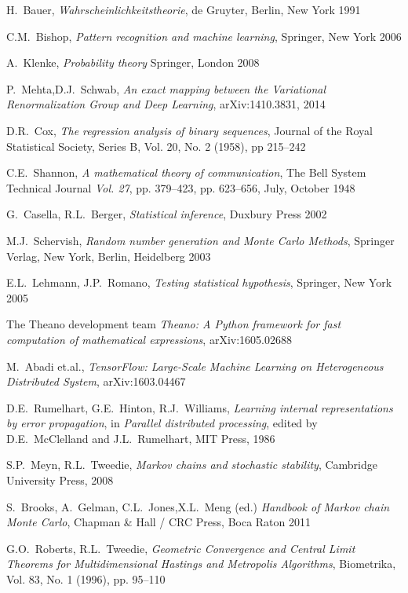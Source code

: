 \documentclass[a4paper, draft]{article}
\theoremstyle{own}
\theoremstyle{remark}
\begin{document}
\begin{thebibliography}{9}
	
H.~Bauer,
{\em Wahrscheinlichkeitstheorie},
de Gruyter, Berlin, New York 1991
	

C.M.~Bishop, 
{\em Pattern recognition and machine learning},
Springer, New York 2006

A.~Klenke,
{\em Probability theory}
Springer, London 2008

P.~Mehta,D.J.~Schwab, 
{\em An exact mapping between the Variational Renormalization Group and Deep Learning},
arXiv:1410.3831, 2014

D.R.~Cox,
{\em The regression analysis of binary sequences},
Journal of the Royal Statistical Society, Series B, Vol. 20, No. 2 (1958), pp 215--242

C.E.~Shannon,
{\em A mathematical theory of communication}, 
The Bell System Technical Journal {\em Vol. 27}, pp. 379--423, pp. 623--656, July, October 1948


G.~Casella, R.L.~Berger,
{\em Statistical inference},
Duxbury Press 2002

M.J.~Schervish,
{\em Random number generation and Monte Carlo Methods},
Springer Verlag, New York, Berlin, Heidelberg 2003

E.L.~Lehmann, J.P.~Romano,
{\em Testing statistical hypothesis},
Springer, New York 2005

The Theano development team
{\em Theano: A Python framework for fast computation of mathematical expressions},
arXiv:1605.02688

M.~Abadi et.al.,
{\em TensorFlow: Large-Scale Machine Learning on Heterogeneous Distributed System},
arXiv:1603.04467

D.E.~Rumelhart, G.E.~Hinton, R.J.~Williams,
{\em Learning internal representations by error propagation}, in
{\em Parallel distributed processing}, edited by D.E.~McClelland and J.L.~Rumelhart, MIT Press, 1986

S.P.~Meyn, R.L.~Tweedie,
{\em Markov chains and stochastic stability},
Cambridge University Press, 2008

S.~Brooks, A.~Gelman, C.L.~Jones,X.L.~Meng (ed.)
{\em Handbook of Markov chain Monte Carlo},
Chapman \& Hall / CRC Press, Boca Raton 2011

G.O.~Roberts, R.L.~Tweedie,
{\em Geometric Convergence and Central Limit Theorems for Multidimensional Hastings and
	Metropolis Algorithms},
Biometrika, Vol. 83, No. 1 (1996), pp. 95--110


\end{thebibliography}
\end{document}
